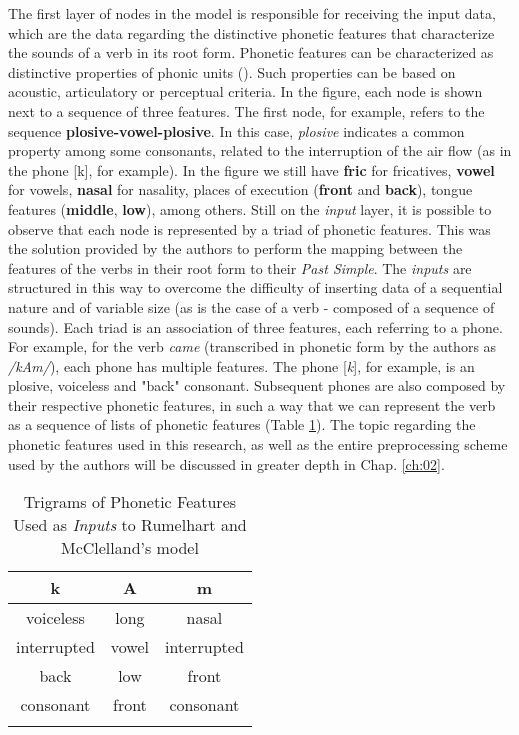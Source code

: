 The first layer of nodes in the model is responsible for receiving the input data, which are the data regarding the distinctive phonetic features that characterize the sounds of a verb in its root form. Phonetic features can be characterized as distinctive properties of phonic units (\cite{paraconhecer:2015}). Such properties can be based on acoustic, articulatory or perceptual criteria. In the figure, each node is shown next to a sequence of three features. The first node, for example, refers to the sequence \textbf{plosive-vowel-plosive}. In this case, \textit{plosive} indicates a common property among some consonants, related to the interruption of the air flow (as in the phone [k], for example). In the figure we still have \textbf{fric} for fricatives, \textbf{vowel} for vowels, \textbf{nasal} for nasality, places of execution (\textbf{front} and \textbf{back}), tongue features (\textbf{middle}, \textbf {low}), among others. Still on the \textit{input} layer, it is possible to observe that each node is represented by a triad of phonetic features. This was the solution provided by the authors to perform the mapping between the features of the verbs in their root form to their \textit{Past Simple}. The \textit{inputs} are structured in this way to overcome the difficulty of inserting data of a sequential nature and of variable size (as is the case of a verb - composed of a sequence of sounds). Each triad is an association of three features, each referring to a phone. For example, for the verb \textit{came} (transcribed in phonetic form by the authors as \textit{/kAm/}), each phone has multiple features. The phone [\textit{k}], for example, is an plosive, voiceless and "back" consonant. Subsequent phones are also composed by their respective phonetic features, in such a way that we can represent the verb as a sequence of lists of phonetic features (Table \ref{tab:trigrams}). The topic regarding the phonetic features used in this research, as well as the entire preprocessing scheme used by the authors \cite{rumelhart:1986} will be discussed in greater depth in Chap. \ref{ch:02}.

\begin{table}[H]
\begin{center}
\begin{tabular}{ccc}
k                    & A                    & m                    \\ \hline
voiceless                & long                & nasal                \\
interrupted         & vowel               & interrupted         \\
back            & low                & front            \\
consonant           & front            & consonant            \\
\multicolumn{1}{l}{} & \multicolumn{1}{l}{} & \multicolumn{1}{l}{}
\end{tabular}
\caption{Trigrams of Phonetic Features Used as  \textit{Inputs} to Rumelhart and McClelland's model}
\label{tab:trigrams}
\end{center}
\end{table}

